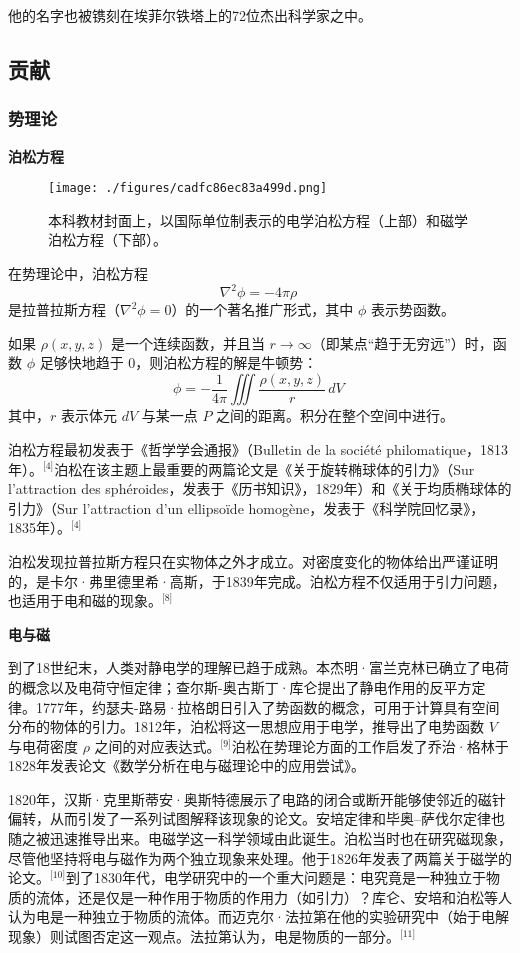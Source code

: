 他的名字也被镌刻在埃菲尔铁塔上的72位杰出科学家之中。
\subsection{贡献}
\subsubsection{势理论}
\textbf{泊松方程}
\begin{figure}[ht]
\centering
\texttt{[image: ./figures/cadfc86ec83a499d.png]}
\caption{本科教材封面上，以国际单位制表示的电学泊松方程（上部）和磁学泊松方程（下部）。} \label{fig_BSDN_2}
\end{figure}
在势理论中，泊松方程
$$
\nabla^2 \phi = -4\pi \rho~
$$
是拉普拉斯方程（$\nabla^2 \phi = 0$）的一个著名推广形式，其中 $\phi$ 表示势函数。

如果 $\rho(x, y, z)$ 是一个连续函数，并且当 $r \to \infty$（即某点“趋于无穷远”）时，函数 $\phi$ 足够快地趋于 0，则泊松方程的解是牛顿势：
$$
\phi = -\frac{1}{4\pi} \iiint \frac{\rho(x, y, z)}{r} \, dV~
$$
其中，$r$ 表示体元 $dV$ 与某一点 $P$ 之间的距离。积分在整个空间中进行。

泊松方程最初发表于《哲学学会通报》（Bulletin de la société philomatique，1813年）。\(^\text{[4]}\)泊松在该主题上最重要的两篇论文是《关于旋转椭球体的引力》（Sur l'attraction des sphéroides，发表于《历书知识》，1829年）和《关于均质椭球体的引力》（Sur l'attraction d'un ellipsoïde homogène，发表于《科学院回忆录》，1835年）。\(^\text{[4]}\)

泊松发现拉普拉斯方程只在实物体之外才成立。对密度变化的物体给出严谨证明的，是卡尔·弗里德里希·高斯，于1839年完成。泊松方程不仅适用于引力问题，也适用于电和磁的现象。\(^\text{[8]}\)

\textbf{电与磁}

到了18世纪末，人类对静电学的理解已趋于成熟。本杰明·富兰克林已确立了电荷的概念以及电荷守恒定律；查尔斯-奥古斯丁·库仑提出了静电作用的反平方定律。1777年，约瑟夫-路易·拉格朗日引入了势函数的概念，可用于计算具有空间分布的物体的引力。1812年，泊松将这一思想应用于电学，推导出了电势函数 $V$ 与电荷密度 $\rho$ 之间的对应表达式。\(^\text{[9]}\)泊松在势理论方面的工作启发了乔治·格林于1828年发表论文《数学分析在电与磁理论中的应用尝试》。

1820年，汉斯·克里斯蒂安·奥斯特德展示了电路的闭合或断开能够使邻近的磁针偏转，从而引发了一系列试图解释该现象的论文。安培定律和毕奥–萨伐尔定律也随之被迅速推导出来。电磁学这一科学领域由此诞生。泊松当时也在研究磁现象，尽管他坚持将电与磁作为两个独立现象来处理。他于1826年发表了两篇关于磁学的论文。\(^\text{[10]}\)到了1830年代，电学研究中的一个重大问题是：电究竟是一种独立于物质的流体，还是仅是一种作用于物质的作用力（如引力）？库仑、安培和泊松等人认为电是一种独立于物质的流体。而迈克尔·法拉第在他的实验研究中（始于电解现象）则试图否定这一观点。法拉第认为，电是物质的一部分。\(^\text{[11]}\)
